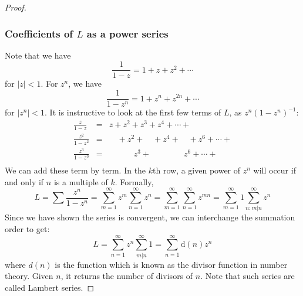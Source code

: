 \documentclass{article}[12pt]
\newtheorem{proof}{Proof}
\begin{document}
\begin{proof}
\subsubsection{Coefficients of $L$ as a power series}
Note that we have
\[
\frac{1}{1-z} = 1 + z + z^2 + \cdots
\]
for $|z|<1$. For $z^n$, we have
\[
\frac{1}{1-z^n} = 1 + z^n + z^{2n} + \cdots
\]
for $|z^n|<1$.
It is instructive to look at the first few terms of $L$, as $z^n(1-z^n)^{-1}$:
\begin{eqnarray}
\frac{z}{1-z} & = & z + z^2 + z^3 + z^4 + \cdots + \nonumber \\
\frac{z^2}{1-z^2} & = & \quad + z^2 + \quad + z^4 + \quad + z^6 + \cdots +\nonumber \\
\frac{z^3}{1-z^3} & = & \quad \quad \quad z^3 + \quad \quad \quad \quad z^6 + \cdots + \nonumber \\
\end{eqnarray}
We can add these term by term.
In the $k$th row, a given power of $z^n$ will occur if and only if $n$ is
a multiple of $k$.
Formally,
\[
L = \sum \frac{z^n}{1-z^n} = \sum_{m=1}^\infty z^m \sum_{n=1}^\infty z^n =  
\sum_{m=1}^\infty\sum_{n=1}^\infty z^{mn} = \sum_{m=1}^\infty 1 \sum_{n:m|n}^\infty z^n
\]
Since we have shown the series is convergent, we can interchange the summation
order to get:
\[
L = \sum_{n=1}^\infty z^n \sum_{m|n}^\infty 1 = \sum_{n=1}^\infty \mbox{d}(n) z^n
\]
where $d(n)$ is the function which is known as the divisor function in
number theory. Given $n$, it returns the number of divisors of $n$.
Note that such series are called Lambert series.
\end{proof}
\end{document}
